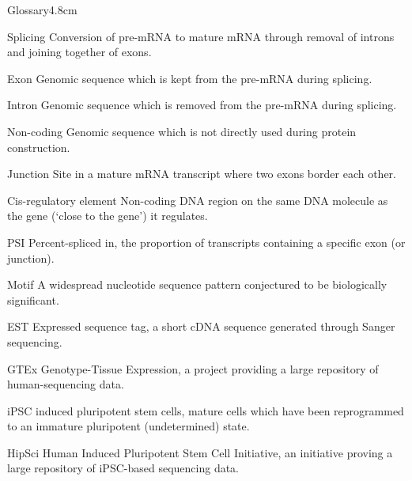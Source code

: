 \begin{mclistof}{Glossary}{4.8cm}
\item[Splicing] Conversion of pre-mRNA to mature mRNA through removal of introns and joining together of exons.
\item[Exon] Genomic sequence which is kept from the pre-mRNA during splicing.
\item[Intron] Genomic sequence which is removed from the pre-mRNA during splicing.
\item[Non-coding] Genomic sequence which is not directly used during protein construction. 
\item[Junction] Site in a mature mRNA transcript where two exons border each other.
\item[Cis-regulatory element] Non-coding DNA region on the same DNA molecule as the gene (`close to the gene') it regulates.
\item[PSI] Percent-spliced in, the proportion of transcripts containing a specific exon (or junction).
\item[Motif] A widespread nucleotide sequence pattern conjectured to be biologically significant.
\item[EST] Expressed sequence tag, a short cDNA sequence generated through Sanger sequencing.
\item[GTEx] Genotype-Tissue Expression, a project providing a large repository of human-sequencing data.

\item[iPSC] induced pluripotent stem cells, mature cells which have been reprogrammed to an immature pluripotent (undetermined) state.
\item[HipSci] Human Induced Pluripotent Stem Cell Initiative, an initiative proving a large repository of iPSC-based sequencing data.


\end{mclistof}
